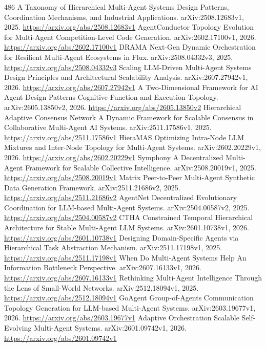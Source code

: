 \documentclass[11pt]{article}
\begin{document}
\begin{thebibliography}{486}
 A Taxonomy of Hierarchical Multi-Agent Systems Design Patterns, Coordination Mechanisms, and Industrial Applications. arXiv:2508.12683v1, 2025. \url{https://arxiv.org/abs/2508.12683v1}
 AgentConductor Topology Evolution for Multi-Agent Competition-Level Code Generation. arXiv:2602.17100v1, 2026. \url{https://arxiv.org/abs/2602.17100v1}
 DRAMA Next-Gen Dynamic Orchestration for Resilient Multi-Agent Ecosystems in Flux. arXiv:2508.04332v3, 2025. \url{https://arxiv.org/abs/2508.04332v3}
 Scaling LLM-Driven Multi-Agent Systems Design Principles and Architectural Scalability Analysis. arXiv:2607.27942v1, 2026. \url{https://arxiv.org/abs/2607.27942v1}
 A Two-Dimensional Framework for AI Agent Design Patterns Cognitive Function and Execution Topology. arXiv:2605.13850v2, 2026. \url{https://arxiv.org/abs/2605.13850v2}
 Hierarchical Adaptive Consensus Network A Dynamic Framework for Scalable Consensus in Collaborative Multi-Agent AI Systems. arXiv:2511.17586v1, 2025. \url{https://arxiv.org/abs/2511.17586v1}
 HieraMAS Optimizing Intra-Node LLM Mixtures and Inter-Node Topology for Multi-Agent Systems. arXiv:2602.20229v1, 2026. \url{https://arxiv.org/abs/2602.20229v1}
 Symphony A Decentralized Multi-Agent Framework for Scalable Collective Intelligence. arXiv:2508.20019v1, 2025. \url{https://arxiv.org/abs/2508.20019v1}
 Matrix Peer-to-Peer Multi-Agent Synthetic Data Generation Framework. arXiv:2511.21686v2, 2025. \url{https://arxiv.org/abs/2511.21686v2}
 AgentNet Decentralized Evolutionary Coordination for LLM-based Multi-Agent Systems. arXiv:2504.00587v2, 2025. \url{https://arxiv.org/abs/2504.00587v2}
 CTHA Constrained Temporal Hierarchical Architecture for Stable Multi-Agent LLM Systems. arXiv:2601.10738v1, 2026. \url{https://arxiv.org/abs/2601.10738v1}
 Designing Domain-Specific Agents via Hierarchical Task Abstraction Mechanism. arXiv:2511.17198v1, 2025. \url{https://arxiv.org/abs/2511.17198v1}
 When Do Multi-Agent Systems Help An Information Bottleneck Perspective. arXiv:2607.16133v1, 2026. \url{https://arxiv.org/abs/2607.16133v1}
 Rethinking Multi-Agent Intelligence Through the Lens of Small-World Networks. arXiv:2512.18094v1, 2025. \url{https://arxiv.org/abs/2512.18094v1}
 GoAgent Group-of-Agents Communication Topology Generation for LLM-based Multi-Agent Systems. arXiv:2603.19677v1, 2026. \url{https://arxiv.org/abs/2603.19677v1}
 Adaptive Orchestration Scalable Self-Evolving Multi-Agent Systems. arXiv:2601.09742v1, 2026. \url{https://arxiv.org/abs/2601.09742v1}

\end{thebibliography}
\end{document}
